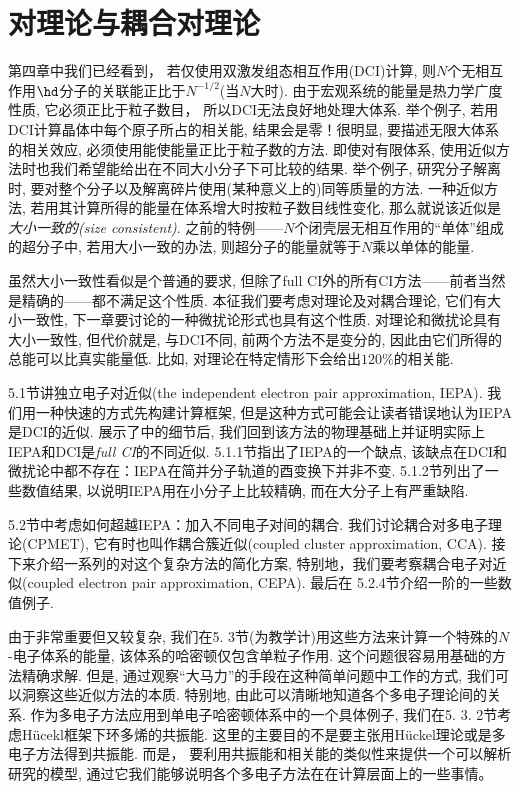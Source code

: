 \chapter{对理论与耦合对理论}
第四章中我们已经看到，
若仅使用双激发组态相互作用(DCI)计算, 
则$N$个无相互作用$\hd$分子的关联能正比于$N^{-1/2}$(当$N$大时). 
由于宏观系统的能量是热力学广度性质, 
它必须正比于粒子数目，
所以DCI无法良好地处理大体系. 
举个例子, 
若用DCI计算晶体中每个原子所占的相关能, 
结果会是零！很明显, 
要描述无限大体系的相关效应, 
必须使用能使能量正比于粒子数的方法. 
即使对有限体系, 
使用近似方法时也我们希望能给出在不同大小分子下可比较的结果. 
举个例子, 
研究分子解离时, 
要对整个分子以及解离碎片使用(某种意义上的)同等质量的方法. 
一种近似方法, 
若用其计算所得的能量在体系增大时按粒子数目线性变化, 
那么就说该近似是\emph{大小一致的(size consistent)}. 
之前的特例——$N$个闭壳层无相互作用的``单体''组成的超分子中, 
若用大小一致的办法, 
则超分子的能量就等于$N$乘以单体的能量.


虽然大小一致性看似是个普通的要求, 
但除了full CI外的所有CI方法——前者当然是精确的——都不满足这个性质. 
本征我们要考虑对理论及对耦合理论, 
它们有大小一致性, 
下一章要讨论的一种微扰论形式也具有这个性质. 
对理论和微扰论具有大小一致性, 
但代价就是, 
与DCI不同, 
前两个方法不是变分的, 
因此由它们所得的总能可以比真实能量低. 
比如, 
对理论在特定情形下会给出$120\%$的相关能.


5.1节讲独立电子对近似(the independent electron pair approximation, IEPA). 我们用一种快速的方式先构建计算框架, 但是这种方式可能会让读者错误地认为IEPA是DCI的近似. 展示了中的细节后, 我们回到该方法的物理基础上并证明实际上IEPA和DCI是\emph{full CI}的不同近似. 5.1.1节指出了IEPA的一个缺点, 该缺点在DCI和微扰论中都不存在：IEPA在简并分子轨道的酉变换下并非不变. 5.1.2节列出了一些数值结果, 以说明IEPA用在小分子上比较精确, 而在大分子上有严重缺陷.

5.2节中考虑如何超越IEPA：加入不同电子对间的耦合. 我们讨论耦合对多电子理论(CPMET), 它有时也叫作耦合簇近似(coupled cluster approximation, CCA). 接下来介绍一系列的对这个复杂方法的简化方案, 特别地，我们要考察耦合电子对近似(coupled electron pair approximation, CEPA). 最后在 5.2.4节介绍一阶的一些数值例子.

由于非常重要但又较复杂, 
我们在5.
3节(为教学计)用这些方法来计算一个特殊的$N$-电子体系的能量, 
该体系的哈密顿仅包含单粒子作用. 
这个问题很容易用基础的方法精确求解. 
但是, 
通过观察``大马力''的手段在这种简单问题中工作的方式, 
我们可以洞察这些近似方法的本质. 
特别地, 
由此可以清晰地知道各个多电子理论间的关系. 
作为多电子方法应用到单电子哈密顿体系中的一个具体例子, 
我们在5.
3.
2节考虑H\"ucekl框架下环多烯的共振能. 
这里的主要目的不是要主张用H\"uckel理论或是多电子方法得到共振能. 
而是，
要利用共振能和相关能的类似性来提供一个可以解析研究的模型, 
通过它我们能够说明各个多电子方法在在计算层面上的一些事情。


